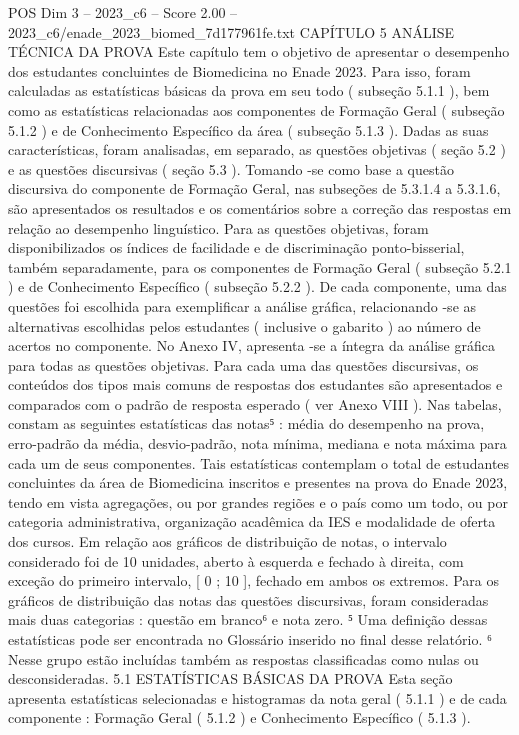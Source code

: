 \begin{textsample}{POS Dim 3 – 2023\_c6 – Score 2.00 – 2023\_c6/enade\_2023\_biomed\_7d177961fe.txt}  \label{ex:f3_pos_107}
CAPÍTULO 5 ANÁLISE TÉCNICA DA PROVA Este capítulo tem o objetivo de apresentar o desempenho dos estudantes concluintes de Biomedicina no Enade 2023.
Para isso, foram calculadas as estatísticas básicas da prova em seu todo ( subseção 5.1.1 ), bem como as estatísticas relacionadas aos componentes de Formação Geral ( subseção 5.1.2 ) e de Conhecimento Específico da área ( subseção 5.1.3 ).
Dadas as suas características, foram analisadas, em separado, as questões objetivas ( seção 5.2 ) e as questões discursivas ( seção 5.3 ).
Tomando -se como base a questão discursiva do componente de Formação Geral, nas subseções de 5.3.1.4 a 5.3.1.6, são apresentados os resultados e os comentários sobre a correção das respostas em relação ao desempenho linguístico.
Para as questões objetivas, foram disponibilizados os índices de facilidade e de discriminação ponto-bisserial, também separadamente, para os componentes de Formação Geral ( subseção 5.2.1 ) e de Conhecimento Específico ( subseção 5.2.2 ).
De cada componente, uma das questões foi escolhida para exemplificar a análise gráfica, relacionando -se as alternativas escolhidas pelos estudantes ( inclusive o gabarito ) ao número de acertos no componente.
No Anexo IV, apresenta -se a íntegra da análise gráfica para todas as questões objetivas.
Para cada uma das questões discursivas, os conteúdos dos tipos mais comuns de respostas dos estudantes são apresentados e comparados com o padrão de resposta esperado ( ver Anexo VIII ).
Nas tabelas, constam as seguintes estatísticas das notas⁵ : média do desempenho na prova, erro-padrão da média, desvio-padrão, nota mínima, mediana e nota máxima para cada um de seus componentes.
Tais estatísticas contemplam o total de estudantes concluintes da área de Biomedicina inscritos e presentes na prova do Enade 2023, tendo em vista agregações, ou por grandes regiões e o país como um todo, ou por categoria administrativa, organização acadêmica da IES e modalidade de oferta dos cursos.
Em relação aos gráficos de distribuição de notas, o intervalo considerado foi de 10 unidades, aberto à esquerda e fechado à direita, com exceção do primeiro intervalo, [ 0 ; 10 ], fechado em ambos os extremos.
Para os gráficos de distribuição das notas das questões discursivas, foram consideradas mais duas categorias : questão em branco⁶ e nota zero. ⁵ Uma definição dessas estatísticas pode ser encontrada no Glossário inserido no final desse relatório. ⁶ Nesse grupo estão incluídas também as respostas classificadas como nulas ou desconsideradas. 5.1 ESTATÍSTICAS BÁSICAS DA PROVA Esta seção apresenta estatísticas selecionadas e histogramas da nota geral ( 5.1.1 ) e de cada componente : Formação Geral ( 5.1.2 ) e Conhecimento Específico ( 5.1.3 ).

\end{textsample}
